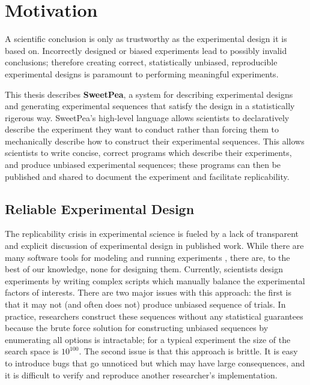 
\chapter{Motivation}

A scientific conclusion is only as trustworthy as the experimental design it is based on. Incorrectly designed or biased experiments lead to possibly invalid conclusions; therefore creating correct, statistically unbiased, reproducible experimental designs is paramount to performing meaningful experiments.

This thesis describes \textbf{SweetPea}, a system for describing experimental designs and generating experimental sequences that satisfy the design in a statistically rigerous way. SweetPea's high-level language allows scientists to declaratively describe the experiment they want to conduct rather than forcing them to mechanically describe how to construct their experimental sequences. This allows scientists to write concise, correct programs which describe their experiments, and produce unbiased experimental sequences; these programs can then be published and shared to document the experiment and facilitate replicability.

\section{Reliable Experimental Design}

The replicability crisis in experimental science is fueled by a lack of transparent and explicit discussion of experimental design in published work. While there are many software tools for modeling and running experiments \cite{cohen1993psyscope} \cite{mathot2012opensesame} \cite{peirce2009generating}, there are, to the best of our knowledge, none for designing them. Currently, scientists design experiments by writing complex scripts which manually balance the experimental factors of interests. There are two major issues with this approach: the first is that it may not (and often does not) produce unbiased sequence of trials. In practice, researchers construct these sequences without any statistical guarantees because the brute force solution for constructing unbiased sequences by enumerating all options is intractable; for a typical experiment the size of the search space is $10^{100}$. The second issue is that this approach is brittle. It is easy to introduce bugs that go unnoticed but which may have large consequences, and it is difficult to verify and reproduce another researcher's implementation.

